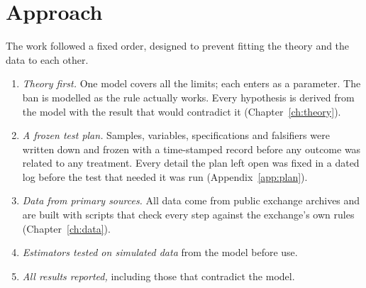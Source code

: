 \section{Approach}
The work followed a fixed order, designed to prevent fitting the theory and the data to each other.
\begin{enumerate}
\item \emph{Theory first.} One model covers all the limits; each enters as a parameter. The ban is modelled as the rule
actually works. Every hypothesis is derived from the model with the result that would contradict it (Chapter~\ref{ch:theory}).
\item \emph{A frozen test plan.} Samples, variables, specifications and falsifiers were written down and frozen with a
time-stamped record before any outcome was related to any treatment. Every detail the plan left open was fixed in a dated
log before the test that needed it was run (Appendix~\ref{app:plan}).
\item \emph{Data from primary sources.} All data come from public exchange archives and are built with scripts that check
every step against the exchange's own rules (Chapter~\ref{ch:data}).
\item \emph{Estimators tested on simulated data} from the model before use.
\item \emph{All results reported,} including those that contradict the model.
\end{enumerate}

